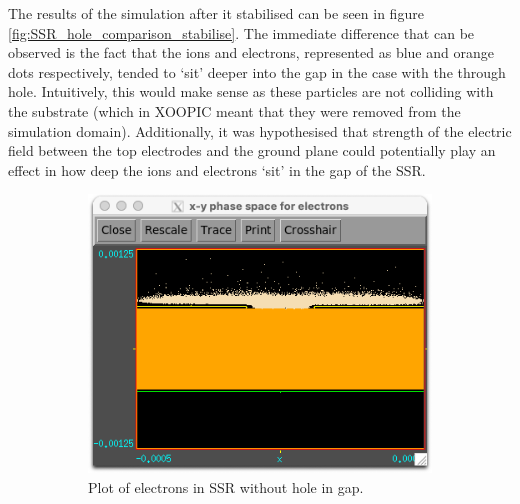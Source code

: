 The results of the simulation after it stabilised can be seen in figure \ref{fig:SSR_hole_comparison_stabilise}. The immediate difference that can be observed is the fact that the ions and electrons, represented as blue and orange dots respectively, tended to `sit' deeper into the gap in the case with the through hole. Intuitively, this would make sense as these particles are not colliding with the substrate (which in XOOPIC meant that they were removed from the simulation domain). Additionally, it was hypothesised that strength of the electric field between the top electrodes and the ground plane could potentially play an effect in how deep the ions and electrons `sit' in the gap of the SSR.

\begin{figure}
    \centering
    \begin{subfigure}[b]{0.475\textwidth}
        \centering
        \includegraphics[width=\textwidth]{chapter_4/figures/SSR_no_hole_electrons.png}
        \caption[]%
        {{\small Plot of electrons in SSR without hole in gap.}}    
        \label{fig:SSR_no_hole_electrons}
    \end{subfigure}
    \hfill
    \begin{subfigure}[b]{0.475\textwidth}  
        \centering 

\end{subfigure}
\end{figure}
